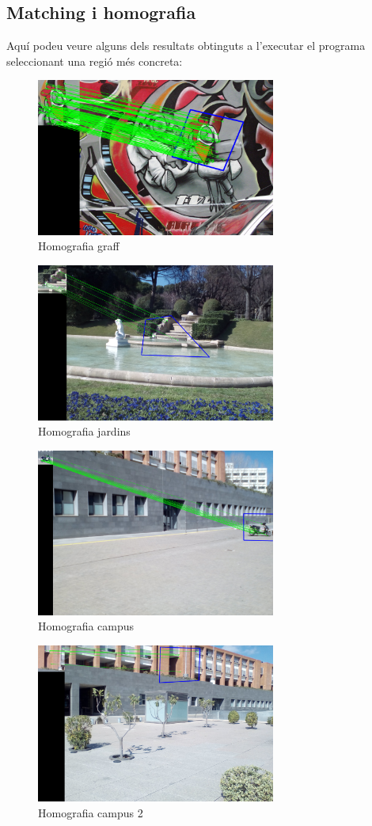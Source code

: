 \newpage
	\subsection{Matching i homografia}
		Aquí podeu veure alguns dels resultats obtinguts a l'executar el programa seleccionant una regió més concreta:
		\begin{figure}[H]
			\centering
			\includegraphics[width=0.7\textwidth]{images/homography}
			\caption{Homografia graff}
		\end{figure}
		\begin{figure}[H]
			\centering
			\includegraphics[width=0.7\textwidth]{images/jardiSel}
			\caption{Homografia jardins}
		\end{figure}

\newpage
		\begin{figure}[H]
			\centering
			\includegraphics[width=0.7\textwidth]{images/uniSel}
			\caption{Homografia campus}
		\end{figure}
		\begin{figure}[H]
			\centering
			\includegraphics[width=0.7\textwidth]{images/uniSel5}
			\caption{Homografia campus 2}
		\end{figure}
